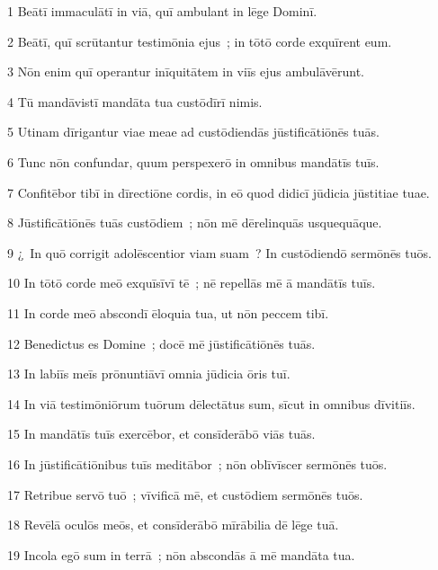 \psalmVerse
  {\phantom{00}1}
  {Beātī immaculātī in viā, quī ambulant in lēge Dominī.}


\psalmVerse
  {\phantom{00}2}
  {Beātī, quī scrūtantur testimōnia ejus~; in tōtō corde exquīrent eum.}


\psalmVerse
  {\phantom{00}3}
  {Nōn enim quī operantur inīquitātem in viīs ejus ambulāvērunt.}


\psalmVerse
  {\phantom{00}4}
  {Tū mandāvistī mandāta tua custōdīrī nimis.}


\psalmVerse
  {\phantom{00}5}
  {Utinam dīrigantur viae meae ad custōdiendās jūstificātiōnēs tuās.}


\psalmVerse
  {\phantom{00}6}
  {Tunc nōn confundar, quum perspexerō in omnibus mandātīs tuīs.}


\psalmVerse
  {\phantom{00}7}
  {Confitēbor tibī in dīrectiōne cordis, in eō quod didicī jūdicia jūstitiae tuae.}


\psalmVerse
  {\phantom{00}8}
  {Jūstificātiōnēs tuās custōdiem~; nōn mē dērelinquās usquequāque.}


\psalmVerse
  {\phantom{00}9}
  {¿~In quō corrigit adolēscentior viam suam~? In custōdiendō sermōnēs tuōs.}


\psalmVerse
  {\phantom{0}10}
  {In tōtō corde meō exquīsīvī tē~; nē repellās mē ā mandātīs tuīs.}


\psalmVerse
  {\phantom{0}11}
  {In corde meō abscondī ēloquia tua, ut nōn peccem tibī.}


\psalmVerse
  {\phantom{0}12}
  {Benedictus es Domine~; docē mē jūstificātiōnēs tuās.}


\psalmVerse
  {\phantom{0}13}
  {In labiīs meīs prōnuntiāvī omnia jūdicia ōris tuī.}


\psalmVerse
  {\phantom{0}14}
  {In viā testimōniōrum tuōrum dēlectātus sum, sīcut in omnibus dīvitiīs.}


\psalmVerse
  {\phantom{0}15}
  {In mandātīs tuīs exercēbor, et consīderābō viās tuās.}


\psalmVerse
  {\phantom{0}16}
  {In jūstificātiōnibus tuīs meditābor~; nōn oblīvīscer sermōnēs tuōs.}


\psalmVerse
  {\phantom{0}17}
  {Retribue servō tuō~; vīvificā mē, et custōdiem sermōnēs tuōs.}


\psalmVerse
  {\phantom{0}18}
  {Revēlā oculōs meōs, et consīderābō mīrābilia dē lēge tuā.}


\psalmVerse
  {\phantom{0}19}
  {Incola egō sum in terrā~; nōn abscondās ā mē mandāta tua.}


